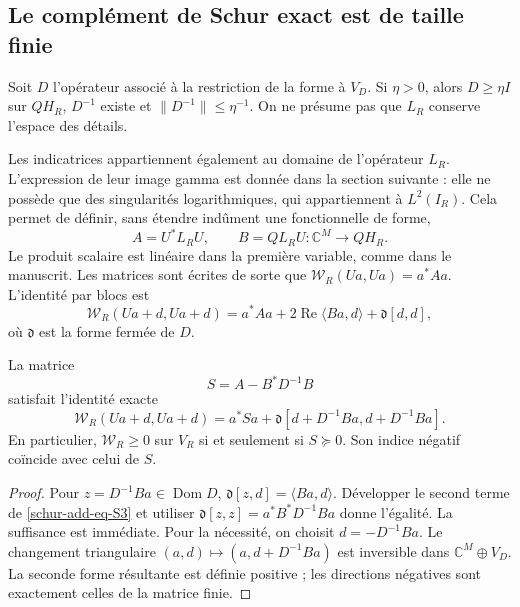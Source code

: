 \subsection{Le complément de Schur exact est de taille finie}
\label{schur-add-sub-97}

Soit \(D\) l'opérateur associé à la restriction de la forme à \(V_D\).
Si \(\eta>0\), alors \(D\geq\eta I\) sur \(QH_R\),
\(D^{-1}\) existe et \(\|D^{-1}\|\leq\eta^{-1}\).
On ne présume pas que \(L_R\) conserve l'espace des détails.

Les indicatrices appartiennent également au domaine de l'opérateur \(L_R\). L'expression de leur image gamma est donnée dans la section suivante : elle ne possède que des singularités logarithmiques, qui appartiennent à \(L^2(I_R)\). Cela permet de définir, sans étendre indûment une fonctionnelle de forme,
\begin{equation}
A=U^*L_RU,\qquad B=QL_RU:\mathbb C^M\longrightarrow QH_R.
\label{schur-add-display-6}
\end{equation}
Le produit scalaire est linéaire dans la première variable, comme dans le
manuscrit. Les matrices sont écrites de sorte que
\(\mathscr W_R(Ua,Ua)=a^*Aa\). L'identité par blocs est
\begin{equation}
\mathscr W_R(Ua+d,Ua+d)
=a^*Aa+2\operatorname{Re}\langle Ba,d\rangle
+\mathfrak d[d,d],
\label{schur-add-display-7}
\end{equation}
où \(\mathfrak d\) est la forme fermée de \(D\).

\begin{theorem}
\label{schur-add-schur-exacto}
La matrice
\begin{equation}
S=A-B^*D^{-1}B
\label{schur-add-eq-S2}
\end{equation}
satisfait l'identité exacte
\begin{equation}
\boxed{\mathscr W_R(Ua+d,Ua+d)
=a^*Sa+
\mathfrak d[d+D^{-1}Ba,d+D^{-1}Ba].}
\label{schur-add-eq-S3}
\end{equation}
En particulier, \(\mathscr W_R\geq0\) sur \(V_R\) si et seulement si \(S\succeq0\). Son indice négatif coïncide avec celui de \(S\).
\end{theorem}
\begin{proof} Pour \(z=D^{-1}Ba\in\operatorname{Dom}D\),
\(\mathfrak d[z,d]=\langle Ba,d\rangle\). Développer le second terme
de \eqref{schur-add-eq-S3} et utiliser \(\mathfrak d[z,z]=a^*B^*D^{-1}Ba\) donne l'égalité.
La suffisance est immédiate. Pour la nécessité, on choisit
\(d=-D^{-1}Ba\). Le changement triangulaire \((a,d)\mapsto(a,d+D^{-1}Ba)\)
est inversible dans \(\mathbb C^M\oplus V_D\). La seconde forme résultante
est définie positive ; les directions négatives sont exactement celles de
la matrice finie.
\end{proof}

